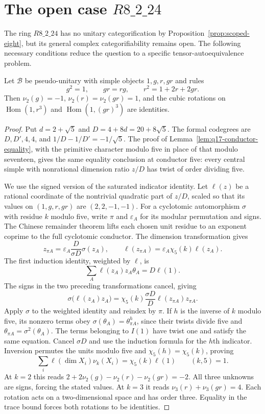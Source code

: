 \section{The open case \texorpdfstring{$R8\_2\_24$}{R8\_2\_24}}
\label{sec:r24-open}
The ring $R8\_2\_24$ has no unitary categorification by
Proposition~\ref{prop:scoped-eight}, but its general complex
categorifiability remains open. The following necessary conditions
reduce the question to a specific tensor-autoequivalence problem.

\begin{lemma}\label{lem:2d2-neutral-indicators}
Let $\mathcal B$ be pseudo-unitary with simple objects $1,g,r,gr$
and rules
\[
 g^2=1,\qquad gr=rg,\qquad r^2=1+2r+2gr.
\]
Then $\nu_2(g)=-1$, $\nu_2(r)=\nu_2(gr)=1$, and the cubic
rotations on $\operatorname{Hom}(1,r^3)$ and
$\operatorname{Hom}(1,(gr)^3)$ are identities.
\end{lemma}
\begin{proof}
Put $d=2+\sqrt5$ and $D=4+8d=20+8\sqrt5$.
The formal codegrees are $D,D',4,4$, and
$1/D-1/D'=-1/\sqrt5$. The proof of Lemma~\ref{lem:q17-conductor-equality}, with the
primitive character modulo five in place of that modulo seventeen,
gives the same equality conclusion at conductor five: every central simple with nonrational dimension
ratio $z/D$ has twist of order dividing five.

We use the signed version of the saturated indicator identity.
Let $\ell(z)$ be a rational coordinate of the nontrivial quadratic
part of $z/D$, scaled so that its values on $(1,g,r,gr)$ are
$(2,2,-1,-1)$. For a cyclotomic automorphism $\sigma$ with residue
$k$ modulo five, write $\pi$ and $\varepsilon_A$ for its modular
permutation and signs. The Chinese remainder theorem lifts each chosen
unit residue to an exponent coprime to the full cyclotomic conductor.
The dimension transformation gives
\[
 z_{\pi A}=\varepsilon_A\frac D{\sigma D}\sigma(z_A),
 \qquad \ell(z_{\pi A})=\varepsilon_A\chi_5(k)\ell(z_A).
\]
The first induction identity, weighted by $\ell$, is
\[
 \sum_A\ell(z_A)z_A\theta_A=D\ell(1).
\]
The signs in the two preceding transformations cancel, giving
\[
 \sigma\bigl(\ell(z_A)z_A\bigr)
 =\chi_5(k)\frac{\sigma D}{D}\ell(z_{\pi A})z_{\pi A}.
\]
Apply $\sigma$ to the weighted identity and reindex by $\pi$.
If $h$ is the inverse of $k$ modulo five, its nonzero terms obey
$\sigma(\theta_A)=\theta_{\pi A}^{h}$, since their twists divide
five and $\theta_{\pi A}=\sigma^2(\theta_A)$. The terms belonging
to $I(1)$ have twist one and satisfy the same equation.
Cancel $\sigma D$ and use the induction formula for the $h$th
indicator. Inversion permutes the units modulo five and
$\chi_5(h)=\chi_5(k)$, proving
\[
 \sum_i\ell(\dim X_i)\nu_k(X_i)=\chi_5(k)\ell(1)
 \qquad (k,5)=1.
\]
At $k=2$ this reads
$2+2\nu_2(g)-\nu_2(r)-\nu_2(gr)=-2$.
All three unknowns are signs, forcing the stated values.
At $k=3$ it reads $\nu_3(r)+\nu_3(gr)=4$.
Each rotation acts on a two-dimensional space and has order
three. Equality in the trace bound forces both rotations to be
identities.
\end{proof}

